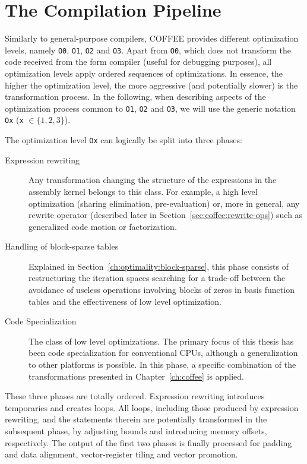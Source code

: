 \section{The Compilation Pipeline}
Similarly to general-purpose compilers, COFFEE provides different optimization levels, namely \texttt{O0}, \texttt{O1}, \texttt{O2} and \texttt{O3}. Apart from \texttt{O0}, which does not transform the code received from the form compiler (useful for debugging purposes), all optimization levels apply ordered sequences of optimizations. In essence, the higher the optimization level, the more aggressive (and potentially slower) is the transformation process. In the following, when describing aspects of the optimization process common to \texttt{O1}, \texttt{O2} and \texttt{O3}, we will use the generic notation \texttt{Ox} (\texttt{x} $\in \lbrace 1, 2, 3\rbrace$).

The optimization level \texttt{Ox} can logically be split into three phases:
\begin{description}
\item[Expression rewriting] Any transformation changing the structure of the expressions in the assembly kernel belongs to this class. For example, a high level optimization (sharing elimination, pre-evaluation) or, more in general, any rewrite operator (described later in Section~\ref{sec:coffee:rewrite-ops}) such as generalized code motion or factorization. 
\item[Handling of block-sparse tables] Explained in Section~\ref{ch:optimality:block-sparse}, this phase consists of restructuring the iteration spaces searching for a trade-off between the avoidance of useless operations involving blocks of zeros in basis function tables and the effectiveness of low level optimization.
\item[Code Specialization] The class of low level optimizations. The primary focus of this thesis has been code specialization for conventional CPUs, although a generalization to other platforms is possible. In this phase, a specific combination of the transformations presented in Chapter~\ref{ch:coffee} is applied.
\end{description}
These three phases are totally ordered. Expression rewriting introduces temporaries and creates loops. All loops, including those produced by expression rewriting, and the statements therein are potentially transformed in the subsequent phase, by adjusting bounds and introducing memory offsets, respectively. The output of the first two phases is finally processed for padding and data alignment, vector-register tiling and vector promotion.

